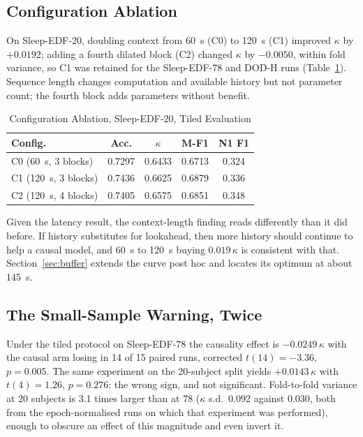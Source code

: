 \documentclass[conference]{IEEEtran}
\begin{document}
\subsection{Configuration Ablation}
\label{sec:config-ablation}

On Sleep-EDF-20, doubling context from 60~s (C0) to 120~s (C1) improved $\kappa$ by $+0.0192$;
adding a fourth dilated block (C2) changed $\kappa$ by $-0.0050$, within fold variance, so C1 was
retained for the Sleep-EDF-78 and DOD-H runs (Table~\ref{tab:config}). Sequence length changes
computation and available history but not parameter count; the fourth block adds parameters without
benefit.

\begin{table}[t]
\caption{Configuration Ablation, Sleep-EDF-20, Tiled Evaluation}
\label{tab:config}
\centering
\begin{tabular}{lcccc}
\toprule
Config. & Acc. & $\kappa$ & M-F1 & N1 F1 \\
\midrule
C0 (60~s, 3 blocks)  & 0.7297 & 0.6433 & 0.6713 & 0.324 \\
C1 (120~s, 3 blocks) & 0.7436 & 0.6625 & 0.6879 & 0.336 \\
C2 (120~s, 4 blocks) & 0.7405 & 0.6575 & 0.6851 & 0.348 \\
\bottomrule
\end{tabular}
\end{table}

Given the latency result, the context-length finding reads differently than it did before. If
history substitutes for lookahead, then more history should continue to help a causal model, and
60~s to 120~s buying $0.019\,\kappa$ is consistent with that. Section~\ref{sec:buffer} extends the
curve post hoc and locates its optimum at about 145~s.

\subsection{The Small-Sample Warning, Twice}
\label{sec:smallsample}

Under the tiled protocol on Sleep-EDF-78 the causality effect is $-0.0249\,\kappa$ with the causal
arm losing in 14 of 15 paired runs, corrected $t(14) = -3.36$, $p = 0.005$. The same experiment on
the 20-subject split yields $+0.0143\,\kappa$ with $t(4) = 1.26$, $p = 0.276$: the wrong sign, and
not significant. Fold-to-fold variance at 20 subjects is 3.1 times larger than at 78 ($\kappa$
s.d.\ 0.092 against 0.030, both from the epoch-normalised runs on which that experiment was
performed), enough to obscure an effect of this magnitude and even invert it.
\end{document}
